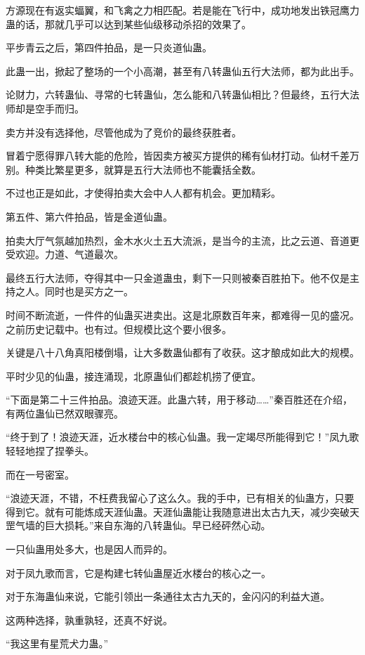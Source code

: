 \begin{this_body}
方源现在有返实蝠翼，和飞禽之力相匹配。若是能在飞行中，成功地发出铁冠鹰力蛊的话，那就几乎可以达到某些仙级移动杀招的效果了。

平步青云之后，第四件拍品，是一只炎道仙蛊。

此蛊一出，掀起了整场的一个小高潮，甚至有八转蛊仙五行大法师，都为此出手。

论财力，六转蛊仙、寻常的七转蛊仙，怎么能和八转蛊仙相比？但最终，五行大法师却是空手而归。

卖方并没有选择他，尽管他成为了竞价的最终获胜者。

冒着宁愿得罪八转大能的危险，皆因卖方被买方提供的稀有仙材打动。仙材千差万别。种类比繁星更多，就算是五行大法师也不能囊括全数。

不过也正是如此，才使得拍卖大会中人人都有机会。更加精彩。

第五件、第六件拍品，皆是金道仙蛊。

拍卖大厅气氛越加热烈，金木水火土五大流派，是当今的主流，比之云道、音道更受欢迎。力道、气道最次。

最终五行大法师，夺得其中一只金道蛊虫，剩下一只则被秦百胜拍下。他不仅是主持之人。同时也是买方之一。

时间不断流逝，一件件的仙蛊买进卖出。这是北原数百年来，都难得一见的盛况。之前历史记载中。也有过。但规模比这个要小很多。

关键是八十八角真阳楼倒塌，让大多数蛊仙都有了收获。这才酿成如此大的规模。

平时少见的仙蛊，接连涌现，北原蛊仙们都趁机捞了便宜。

“下面是第二十三件拍品。浪迹天涯。此蛊六转，用于移动……”秦百胜还在介绍，有两位蛊仙已然双眼骤亮。

“终于到了！浪迹天涯，近水楼台中的核心仙蛊。我一定竭尽所能得到它！”凤九歌轻轻地捏了捏拳头。

而在一号密室。

“浪迹天涯，不错，不枉费我留心了这么久。我的手中，已有相关的仙蛊方，只要得到它。就有可能炼成天涯仙蛊。天涯仙蛊能让我随意进出太古九天，减少突破天罡气墙的巨大损耗。”来自东海的八转蛊仙。早已经砰然心动。

一只仙蛊用处多大，也是因人而异的。

对于凤九歌而言，它是构建七转仙蛊屋近水楼台的核心之一。

对于东海蛊仙来说，它能引领出一条通往太古九天的，金闪闪的利益大道。

这两种选择，孰重孰轻，还真不好说。

“我这里有星荒犬力蛊。”


\end{this_body}
